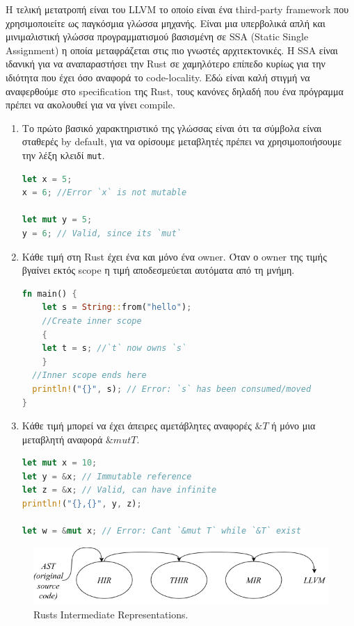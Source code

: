 Η τελική μετατροπή είναι του LLVM το οποίο είναι ένα third-party framework που χρησιμοποιείτε ως
παγκόσμια γλώσσα μηχανής. Είναι μια υπερβολικά απλή και μινιμαλιστική γλώσσα προγραμματισμού βασισμένη
σε SSA (Static Single Assignment) η οποία μεταφράζεται στις πιο γνωστές αρχιτεκτονικές. Η SSA είναι ιδανική
για να αναπαραστήσει την Rust σε χαμηλότερο επίπεδο κυρίως για την ιδιότητα που έχει όσο αναφορά το code-locality.
Εδώ είναι καλή στιγμή να αναφερθούμε στο specification της Rust, τους κανόνες δηλαδή που ένα πρόγραμμα πρέπει να
ακολουθεί για να γίνει compile.


\begin{enumerate}
  \item Το πρώτο βασικό χαρακτηριστικό της γλώσσας είναι ότι τα σύμβολα είναι σταθερές by default, για να ορίσουμε μεταβλητές
    πρέπει να χρησιμοποιήσουμε την λέξη κλειδί \verb|mut|.    
\begin{lstlisting}[language=Rust]
let x = 5;
x = 6; //Error `x` is not mutable

let mut y = 5;
y = 6; // Valid, since its `mut`
    \end{lstlisting}
  \item Κάθε τιμή στη Rust έχει ένα και μόνο ένα owner. Όταν ο owner της τιμής βγαίνει εκτός
    scope η τιμή αποδεσμεύεται αυτόματα από τη μνήμη.    
\begin{lstlisting}[language=Rust]
fn main() {
    let s = String::from("hello"); 
    //Create inner scope
    {
    let t = s; //`t` now owns `s`
    }
  //Inner scope ends here
  println!("{}", s); // Error: `s` has been consumed/moved
}
\end{lstlisting}
\item Κάθε τιμή μπορεί να έχει άπειρες αμετάβλητες αναφορές $\&Τ$ ή μόνο μια μεταβλητή αναφορά
  $\&mut T$.  
\begin{lstlisting}[language=Rust]
let mut x = 10;
let y = &x; // Immutable reference 
let z = &x; // Valid, can have infinite 
println!("{},{}", y, z);

let w = &mut x; // Error: Cant `&mut T` while `&T` exist
\end{lstlisting}
\end{enumerate}

\begin{figure}[!htb]
    \centering
    \includegraphics[scale=0.4]{images/rust/rust_irs.png}
    \caption{Rusts Intermediate Representations.}
    \label{fig:rust_ir}
\end{figure}
